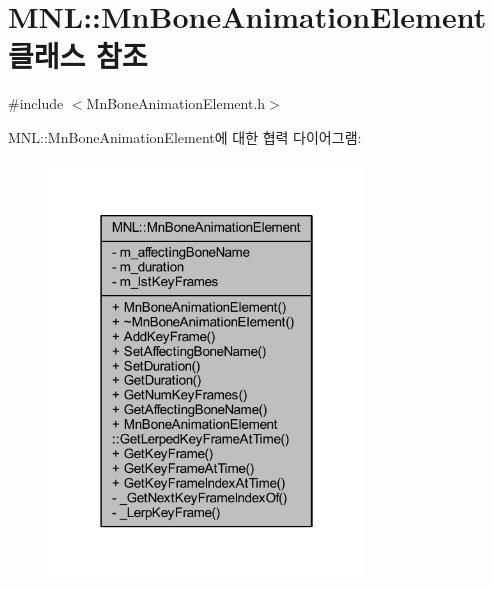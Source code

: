 \hypertarget{class_m_n_l_1_1_mn_bone_animation_element}{}\section{M\+NL\+:\+:Mn\+Bone\+Animation\+Element 클래스 참조}
\label{class_m_n_l_1_1_mn_bone_animation_element}


{\ttfamily \#include $<$Mn\+Bone\+Animation\+Element.\+h$>$}



M\+NL\+:\+:Mn\+Bone\+Animation\+Element에 대한 협력 다이어그램\+:\nopagebreak
\begin{figure}[H]
\begin{center}
\leavevmode
\includegraphics[width=238pt]{class_m_n_l_1_1_mn_bone_animation_element__coll__graph}
\end{center}
\end{figure}
